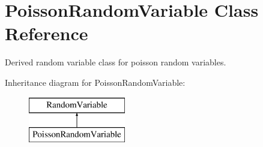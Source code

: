 \section{Poisson\+Random\+Variable Class Reference}
\label{classPecos_1_1PoissonRandomVariable}


Derived random variable class for poisson random variables.  


Inheritance diagram for Poisson\+Random\+Variable\+:\begin{figure}[H]
\begin{center}
\leavevmode
\includegraphics[height=2.000000cm]{classPecos_1_1PoissonRandomVariable}
\end{center}
\end{figure}
